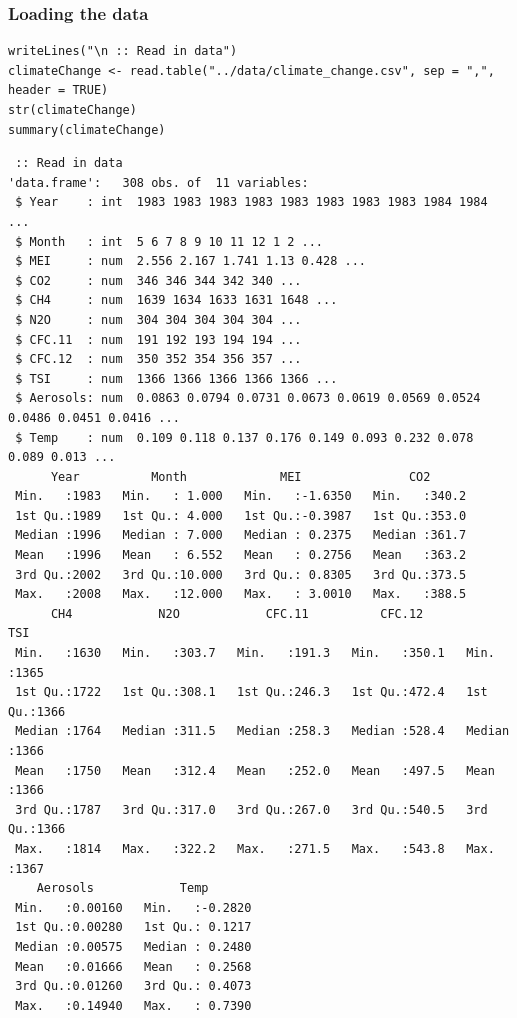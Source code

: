 \documentclass[letterpaper, 9pt, onecolumn, twoside, technote, final]{IEEEtran}
\begin{document}
\subsubsection{Loading the data}
\label{sec-1-1-2}

\begin{verbatim}
writeLines("\n :: Read in data")
climateChange <- read.table("../data/climate_change.csv", sep = ",", header = TRUE)
str(climateChange)
summary(climateChange)
\end{verbatim}

\begin{verbatim}
 :: Read in data
'data.frame':	308 obs. of  11 variables:
 $ Year    : int  1983 1983 1983 1983 1983 1983 1983 1983 1984 1984 ...
 $ Month   : int  5 6 7 8 9 10 11 12 1 2 ...
 $ MEI     : num  2.556 2.167 1.741 1.13 0.428 ...
 $ CO2     : num  346 346 344 342 340 ...
 $ CH4     : num  1639 1634 1633 1631 1648 ...
 $ N2O     : num  304 304 304 304 304 ...
 $ CFC.11  : num  191 192 193 194 194 ...
 $ CFC.12  : num  350 352 354 356 357 ...
 $ TSI     : num  1366 1366 1366 1366 1366 ...
 $ Aerosols: num  0.0863 0.0794 0.0731 0.0673 0.0619 0.0569 0.0524 0.0486 0.0451 0.0416 ...
 $ Temp    : num  0.109 0.118 0.137 0.176 0.149 0.093 0.232 0.078 0.089 0.013 ...
      Year          Month             MEI               CO2
 Min.   :1983   Min.   : 1.000   Min.   :-1.6350   Min.   :340.2
 1st Qu.:1989   1st Qu.: 4.000   1st Qu.:-0.3987   1st Qu.:353.0
 Median :1996   Median : 7.000   Median : 0.2375   Median :361.7
 Mean   :1996   Mean   : 6.552   Mean   : 0.2756   Mean   :363.2
 3rd Qu.:2002   3rd Qu.:10.000   3rd Qu.: 0.8305   3rd Qu.:373.5
 Max.   :2008   Max.   :12.000   Max.   : 3.0010   Max.   :388.5
      CH4            N2O            CFC.11          CFC.12           TSI
 Min.   :1630   Min.   :303.7   Min.   :191.3   Min.   :350.1   Min.   :1365
 1st Qu.:1722   1st Qu.:308.1   1st Qu.:246.3   1st Qu.:472.4   1st Qu.:1366
 Median :1764   Median :311.5   Median :258.3   Median :528.4   Median :1366
 Mean   :1750   Mean   :312.4   Mean   :252.0   Mean   :497.5   Mean   :1366
 3rd Qu.:1787   3rd Qu.:317.0   3rd Qu.:267.0   3rd Qu.:540.5   3rd Qu.:1366
 Max.   :1814   Max.   :322.2   Max.   :271.5   Max.   :543.8   Max.   :1367
    Aerosols            Temp
 Min.   :0.00160   Min.   :-0.2820
 1st Qu.:0.00280   1st Qu.: 0.1217
 Median :0.00575   Median : 0.2480
 Mean   :0.01666   Mean   : 0.2568
 3rd Qu.:0.01260   3rd Qu.: 0.4073
 Max.   :0.14940   Max.   : 0.7390
\end{verbatim}
\end{document}
